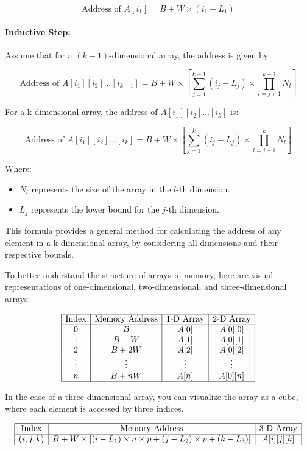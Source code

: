 \documentclass{book}
\begin{document}
\[
\text{Address of } A[i_1] = B + W \times (i_1 - L_1)
\]

\paragraph{Inductive Step:}
Assume that for a \( (k-1) \)-dimensional array, the address is given by:

\[
\text{Address of } A[i_1][i_2] \dots [i_{k-1}] = B + W \times \left[ \sum_{j=1}^{k-1} (i_j - L_j) \times \prod_{l=j+1}^{k-1} N_l \right]
\]

For a k-dimensional array, the address of \( A[i_1][i_2] \dots [i_k] \) is:

\[
\text{Address of } A[i_1][i_2] \dots [i_k] = B + W \times \left[ \sum_{j=1}^{k} (i_j - L_j) \times \prod_{l=j+1}^{k} N_l \right]
\]

Where:
\begin{itemize}
	\item \( N_l \) represents the size of the array in the \( l \)-th dimension.
	\item \( L_j \) represents the lower bound for the \( j \)-th dimension.
\end{itemize}

This formula provides a general method for calculating the address of any element in a k-dimensional array, by considering all dimensions and their respective bounds.

To better understand the structure of arrays in memory, here are visual representations of one-dimensional, two-dimensional, and three-dimensional arrays:

\[
\begin{array}{|c|c|c|c|}
	\hline
	\text{Index} & \text{Memory Address} & \text{1-D Array} & \text{2-D Array} \\
	\hline
	0 & B & A[0] & A[0][0] \\
	1 & B + W & A[1] & A[0][1] \\
	2 & B + 2W & A[2] & A[0][2] \\
	\vdots & \vdots & \vdots & \vdots \\
	n & B + nW & A[n] & A[0][n] \\
	\hline
\end{array}
\]

In the case of a three-dimensional array, you can visualize the array as a cube, where each element is accessed by three indices.

\[
\begin{array}{|c|c|c|}
	\hline
	\text{Index} & \text{Memory Address} & \text{3-D Array} \\
	\hline
	(i, j, k) & B + W \times \left[ (i - L_1) \times n \times p + (j - L_2) \times p + (k - L_3) \right] & A[i][j][k] \\
	\hline
\end{array}
\]
\end{document}
